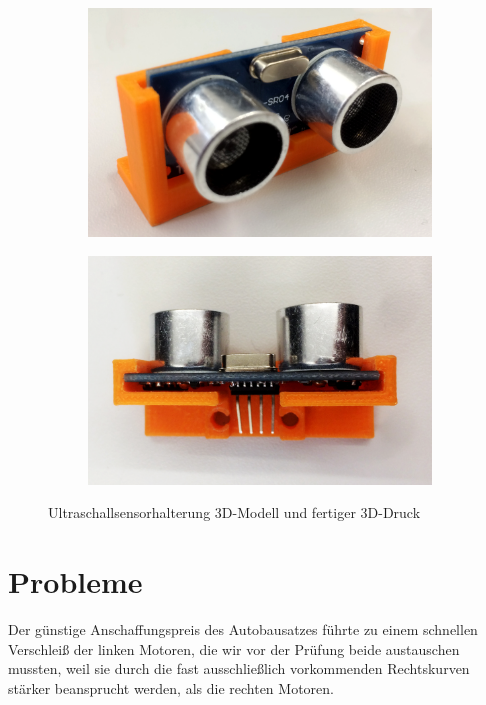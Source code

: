 \documentclass[a4paper, 12pt]{scrartcl}
\begin{document}
\begin{figure}[H]
\begin{subfigure}{.375\textwidth}
		\includegraphics[width=\textwidth]{../bilder_videos/Sensorhalterung.png}
	\end{subfigure}%
	\begin{subfigure}{.375\textwidth}
		\centering
		\includegraphics[width=\textwidth]{../bilder_videos/Sensorhalterung_Top.png}
	\end{subfigure}%
	\caption{Ultraschallsensorhalterung 3D-Modell und fertiger 3D-Druck}
\end{figure}

\section{Probleme}
Der günstige Anschaffungspreis des Autobausatzes führte zu einem schnellen Verschleiß der linken Motoren, die wir vor der Prüfung beide austauschen mussten, weil sie durch die fast ausschließlich vorkommenden Rechtskurven stärker beansprucht werden, als die rechten Motoren.
\end{document}
